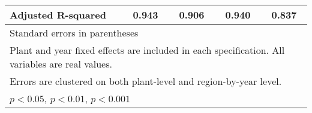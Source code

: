 \begin{table}[htbp]
\begin{tabular}{l*{4}{c}}
Adjusted R-squared&    0.943         &    0.906         &    0.940         &    0.837         \\
\bottomrule
\multicolumn{5}{l}{\footnotesize Standard errors in parentheses}\\
\multicolumn{5}{l}{\footnotesize Plant and year fixed effects are included in each specification. All variables are real values.}\\
\multicolumn{5}{l}{\footnotesize Errors are clustered on both plant-level and region-by-year level. }\\
\multicolumn{5}{l}{\footnotesize \sym{*} \(p<0.05\), \sym{**} \(p<0.01\), \sym{***} \(p<0.001\)}\\
\end{tabular}
\end{table}
